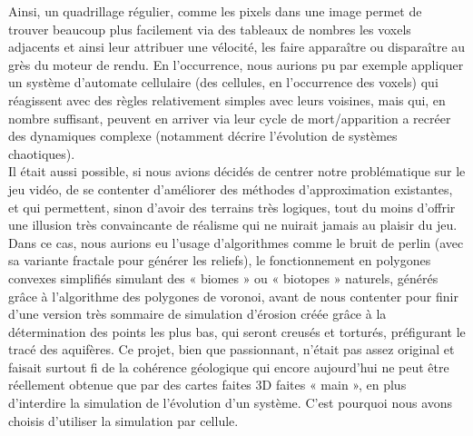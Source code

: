 \documentclass[a4paper,11pt]{article}
\begin{document}
Ainsi, un quadrillage régulier, comme les pixels dans une image permet de trouver beaucoup plus facilement via des tableaux de nombres les voxels adjacents et ainsi leur attribuer une vélocité, les faire apparaître ou disparaître au grès du moteur de rendu.
En l'occurrence, nous aurions pu par exemple appliquer un système d'automate cellulaire (des cellules, en l'occurrence des voxels) qui réagissent avec des règles relativement simples avec leurs voisines, mais qui, en nombre suffisant, peuvent en arriver via leur cycle de mort/apparition a recréer des dynamiques complexe (notamment décrire l'évolution de systèmes chaotiques). \\
Il était aussi possible, si nous avions décidés de centrer notre problématique sur le jeu vidéo, de se contenter d'améliorer des méthodes d'approximation existantes, et qui permettent, sinon d'avoir des terrains très logiques, tout du moins d'offrir une illusion très convaincante de réalisme qui ne nuirait jamais au plaisir du jeu.
Dans ce cas, nous aurions eu l'usage d'algorithmes comme le bruit de perlin (avec sa variante fractale pour générer les reliefs), le fonctionnement en polygones convexes simplifiés simulant des « biomes » ou « biotopes » naturels, générés grâce à l'algorithme des polygones de voronoi, avant de nous contenter pour finir d'une version très sommaire de simulation d'érosion créée grâce à la détermination des points les plus bas, qui seront creusés et torturés, préfigurant le tracé des aquifères.
Ce projet, bien que passionnant, n'était pas assez original et faisait surtout fi de la cohérence géologique qui encore aujourd'hui ne peut être réellement obtenue que par des cartes faites 3D faites « main », en plus d'interdire la simulation de l'évolution d'un système.
C'est pourquoi nous avons choisis d'utiliser la simulation par cellule. \\
\end{document}
